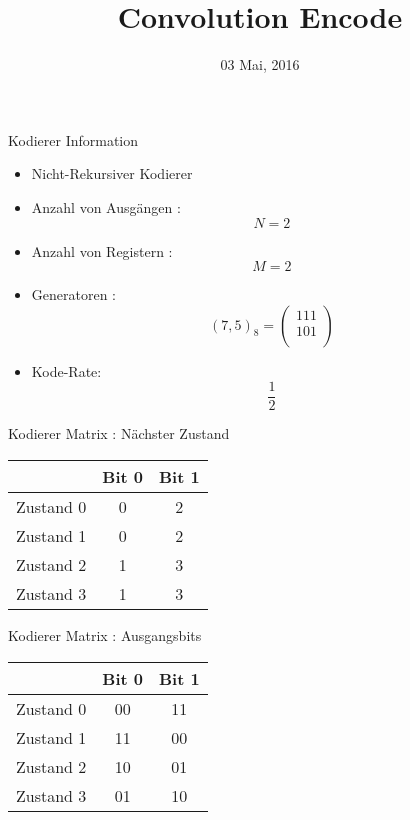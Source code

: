 \documentclass[8pt,ignorenonframetext,]{beamer}
\title{Convolution Encode}
\date{03 Mai, 2016}
\begin{document}
\frame{\titlepage}

\begin{frame}{Kodierer Information}

\begin{itemize}
\itemsep1pt\parskip0pt
\item
  Nicht-Rekursiver Kodierer
\item
  Anzahl von Ausgängen : \[N=2\]
\item
  Anzahl von Registern : \[M=2\]
\item
  Generatoren : \[(7,5)_8 = \begin{pmatrix}111 \\ 101 \\ \end{pmatrix}\]
\item
  Kode-Rate: \[\frac{1}{2}\]
\end{itemize}

\end{frame}

\begin{frame}{Kodierer Matrix : Nächster Zustand}

\begin{tabular}{l|c|c}
\hline
  & Bit 0 & Bit 1\\
\hline
Zustand  0 & 0 & 2\\
\hline
Zustand  1 & 0 & 2\\
\hline
Zustand  2 & 1 & 3\\
\hline
Zustand  3 & 1 & 3\\
\hline
\end{tabular}

\end{frame}

\begin{frame}{Kodierer Matrix : Ausgangsbits}

\begin{tabular}{l|c|c}
\hline
  & Bit 0 & Bit 1\\
\hline
Zustand  0 & 00 & 11\\
\hline
Zustand  1 & 11 & 00\\
\hline
Zustand  2 & 10 & 01\\
\hline
Zustand  3 & 01 & 10\\
\hline
\end{tabular}

\end{frame}
\end{document}
